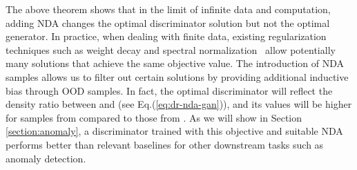 \documentclass{article} \usepackage{iclr2021_conference,times}
\newtheorem{theorem}{Theorem}
\newcommand{\js}[1]{{\color{teal} [JS: #1]}}
\begin{document}
The above theorem shows that in the limit of infinite data and computation, adding NDA changes the optimal discriminator solution but not the optimal generator.
In practice, when dealing with finite data, existing regularization techniques such as weight decay and spectral normalization~\citep{miyato2018spectral} allow potentially many solutions that achieve the same objective value.
The introduction of NDA samples allows us to filter out certain solutions by providing additional inductive bias through OOD samples.  In fact, the optimal
discriminator 
will reflect the density ratio between  and  (see Eq.(\ref{eq:dr-nda-gan})),  
and its values will be higher for samples from  compared to those from  . As we will show in Section \ref{section:anomaly}, a discriminator trained with this objective and suitable NDA performs better than relevant baselines for other downstream tasks such as anomaly detection. 








\iffalse
\begin{theorem}
Let  be a distribution over . Let  be a distribution over  with disjoint support than , i.e., such that . Let

be an -divergence. Then for all 

\end{theorem}
\begin{proof}
Let us use  to denote the density functions of  and  respectively.

 where we use the fact that  is convex with Jensen's inequality in Eq.(\ref{eq:jensen-f}) and the fact that  in Eq.(\ref{eq:final-step}) since  and  has disjoint support.
 
 We also have
 
\end{proof}



As a corollary, let  be a data distribution. Let  be any distribution with disjoint support (e.g., Jigsaw). Then


TODO: check things still work when  is allowed to depend on 

\js{i think this is still true}
\fi






 
\end{document}
